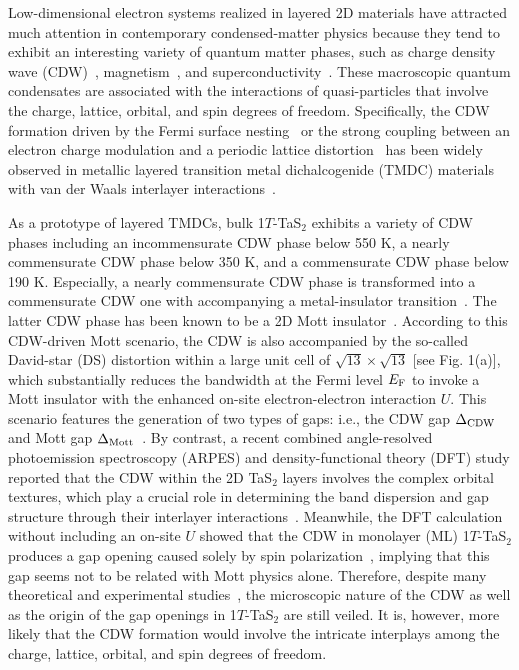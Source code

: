 \documentclass[aps,prl,twocolumn,showpacs,byrevtex]{revtex4}
\begin{document}
Low-dimensional electron systems realized in layered 2D materials have attracted much attention in contemporary condensed-matter physics because they tend to exhibit an interesting variety of quantum matter phases, such as charge density wave (CDW)~\cite{Shen,Xi,Keum,chen}, magnetism~\cite{Ma}, and superconductivity~\cite{Fri}. These macroscopic quantum condensates are associated with the interactions of quasi-particles that involve the charge, lattice, orbital, and spin degrees of freedom. Specifically, the CDW formation driven by the Fermi surface nesting~\cite{Peierls} or the strong coupling between an electron charge modulation and a periodic lattice distortion~\cite{Johannes,Zhua} has been widely observed in metallic layered transition metal dichalcogenide (TMDC) materials with van der Waals interlayer interactions~\cite{Shen,Xi,Keum,chen}.

As a prototype of layered TMDCs, bulk 1$T$-TaS$_2$ exhibits a variety of CDW phases including an incommensurate CDW phase below 550 K, a nearly commensurate CDW phase below 350 K, and a commensurate CDW phase below 190 K. Especially, a nearly commensurate CDW phase is transformed into a commensurate CDW one with accompanying a metal-insulator transition~\cite{Sip,Salvo,Fazekas}. The latter CDW phase has been known to be a 2D Mott insulator~\cite{Fazekas,Wilson,Kim,Perfetti,Perfetti2,Yeom}. According to this CDW-driven Mott scenario, the CDW is also accompanied by the so-called David-star (DS) distortion within a large unit cell of ${\sqrt{13}}{\times}{\sqrt{13}}$ [see Fig. 1(a)], which substantially reduces the bandwidth at the Fermi level $E_{\rm F}$ to invoke a Mott insulator with the enhanced on-site electron-electron interaction $U$. This scenario features the generation of two types of gaps: i.e., the CDW gap ${\Delta}_{\rm CDW}$ and Mott gap ${\Delta}_{\rm Mott}$~\cite{Yeom}. By contrast, a recent combined angle-resolved photoemission spectroscopy (ARPES) and density-functional theory (DFT) study reported that the CDW within the 2D TaS$_2$ layers involves the complex orbital textures, which play a crucial role in determining the band dispersion and gap structure through their interlayer interactions~\cite{Ritschel}. Meanwhile, the DFT calculation without including an on-site $U$ showed that the CDW in monolayer (ML) 1$T$-TaS$_2$ produces a gap opening caused solely by spin polarization~\cite{zhang2014prb}, implying that this gap seems not to be related with Mott physics alone. Therefore, despite many theoretical and experimental studies~\cite{Sip,Salvo,Fazekas,Wilson,Kim,Perfetti,Perfetti2,Yeom,Ritschel,zhang2014prb}, the microscopic nature of the CDW as well as the origin of the gap openings in 1$T$-TaS$_2$ are still veiled. It is, however, more likely that the CDW formation would involve the intricate interplays among the charge, lattice, orbital, and spin degrees of freedom.
\end{document}
